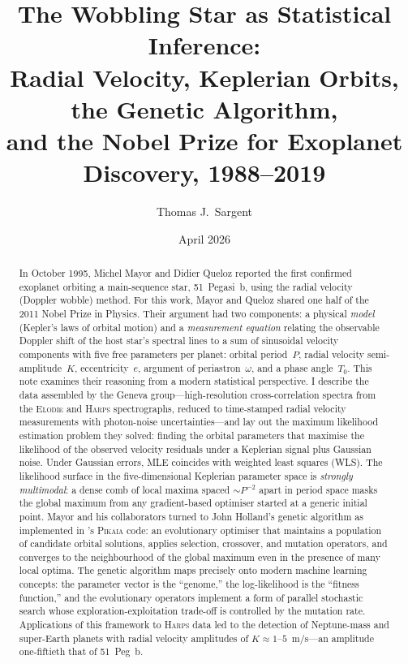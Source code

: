 \documentclass[12pt]{article}
\title{The Wobbling Star as Statistical Inference:\\
       Radial Velocity, Keplerian Orbits, the Genetic Algorithm,\\
       and the Nobel Prize for Exoplanet Discovery, 1988--2019}
\author{Thomas J.\ Sargent}
\date{April 2026}
\begin{document}
\maketitle

\begin{abstract}
In October 1995, Michel Mayor and Didier Queloz \citep{Mayor1995}
reported the first confirmed exoplanet orbiting a main-sequence star,
51~Pegasi~b, using the radial velocity (Doppler wobble) method.
For this work, Mayor and Queloz shared one half of the 2011 Nobel Prize
in Physics.  Their argument had two components: a physical \emph{model}
(Kepler's laws of orbital motion) and a \emph{measurement equation}
relating the observable Doppler shift of the host star's spectral lines to
a sum of sinusoidal velocity components with five free parameters per
planet: orbital period~$P$, radial velocity semi-amplitude~$K$,
eccentricity~$e$, argument of periastron~$\omega$, and a phase
angle~$T_0$.  This note examines their reasoning from a modern
statistical perspective.  I describe the data assembled by the Geneva
group---high-resolution cross-correlation spectra from the
\textsc{Elodie} and \textsc{Harps} spectrographs, reduced to
time-stamped radial velocity measurements with photon-noise
uncertainties---and lay out the maximum likelihood estimation problem
they solved: finding the orbital parameters that maximise the likelihood
of the observed velocity residuals under a Keplerian signal plus
Gaussian noise.  Under Gaussian errors, MLE coincides with weighted
least squares (WLS).  The likelihood surface in the five-dimensional
Keplerian parameter space is \emph{strongly multimodal}: a dense comb
of local maxima spaced $\sim P^{-2}$ apart in period space masks the
global maximum from any gradient-based optimiser started at a generic
initial point.  Mayor and his collaborators turned to John Holland's
genetic algorithm \citep{Holland1975} as implemented in
\citet{Charbonneau1995}'s \textsc{Pikaia} code: an evolutionary optimiser
that maintains a population of candidate orbital solutions, applies
selection, crossover, and mutation operators, and converges to the
neighbourhood of the global maximum even in the presence of many local
optima.  The genetic algorithm maps precisely onto modern machine learning
concepts: the parameter vector is the ``genome,'' the log-likelihood is
the ``fitness function,'' and the evolutionary operators implement a form
of parallel stochastic search whose exploration-exploitation trade-off
is controlled by the mutation rate.  Applications of this framework to
\textsc{Harps} data led to the detection of Neptune-mass and super-Earth
planets with radial velocity amplitudes of $K \approx 1$--$5$~m/s---an
amplitude one-fiftieth that of 51~Peg~b.
\end{abstract}
\end{document}
